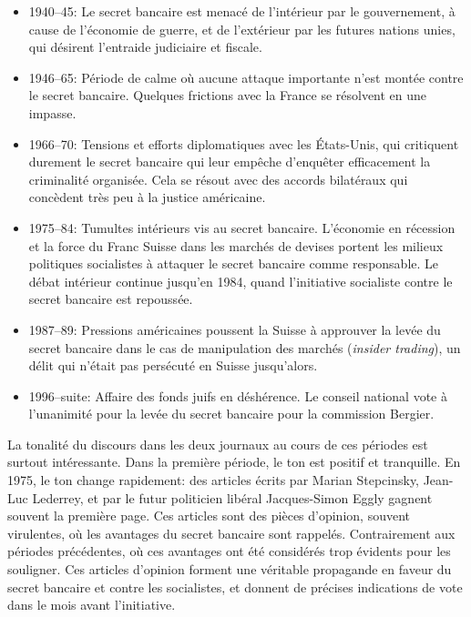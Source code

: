 \documentclass[11pt]{article}
\begin{document}
\begin{itemize}
\item
  1940--45: Le secret bancaire est menacé de l'intérieur par le
  gouvernement, à cause de l'économie de guerre, et de l'extérieur par
  les futures nations unies, qui désirent l'entraide judiciaire et
  fiscale.
\item
  1946--65: Période de calme où aucune attaque importante n'est montée
  contre le secret bancaire. Quelques frictions avec la France se
  résolvent en une impasse.
\item
  1966--70: Tensions et efforts diplomatiques avec les États-Unis, qui
  critiquent durement le secret bancaire qui leur empêche d'enquêter
  efficacement la criminalité organisée. Cela se résout avec des accords
  bilatéraux qui concèdent très peu à la justice américaine.
\item
  1975--84: Tumultes intérieurs vis au secret bancaire. L'économie en
  récession et la force du Franc Suisse dans les marchés de devises
  portent les milieux politiques socialistes à attaquer le secret
  bancaire comme responsable. Le débat intérieur continue jusqu'en 1984,
  quand l'initiative socialiste contre le secret bancaire est repoussée.
\item
  1987--89: Pressions américaines poussent la Suisse à approuver la
  levée du secret bancaire dans le cas de manipulation des marchés
  (\emph{insider trading}), un délit qui n'était pas persécuté en Suisse
  jusqu'alors.
\item
  1996--suite: Affaire des fonds juifs en déshérence. Le conseil
  national vote à l'unanimité pour la levée du secret bancaire pour la
  commission Bergier.
\end{itemize}

La tonalité du discours dans les deux journaux au cours de ces périodes
est surtout intéressante. Dans la première période, le ton est positif
et tranquille. En 1975, le ton change rapidement: des articles écrits
par Marian Stepcinsky, Jean-Luc Lederrey, et par le futur politicien
libéral Jacques-Simon Eggly gagnent souvent la première page. Ces
articles sont des pièces d'opinion, souvent virulentes, où les avantages
du secret bancaire sont rappelés. Contrairement aux périodes
précédentes, où ces avantages ont été considérés trop évidents pour les
souligner. Ces articles d'opinion forment une véritable propagande en
faveur du secret bancaire et contre les socialistes, et donnent de
précises indications de vote dans le mois avant l'initiative.
\end{document}
